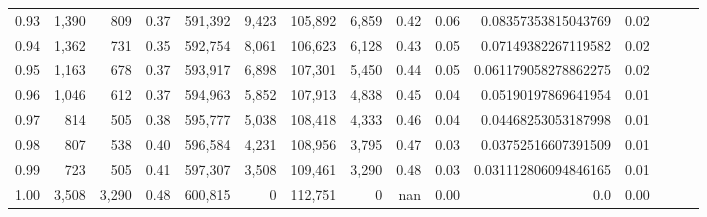 \begin{tabular}{rrrrrrrrrrrrrrr}
0.93 &   1,390 &    809 &  0.37 &  591,392 &    9,423 &  105,892 &    6,859 &  0.42 &  0.06 &   0.08357353815043769 &      0.02 \\
0.94 &   1,362 &    731 &  0.35 &  592,754 &    8,061 &  106,623 &    6,128 &  0.43 &  0.05 &   0.07149382267119582 &      0.02 \\
0.95 &   1,163 &    678 &  0.37 &  593,917 &    6,898 &  107,301 &    5,450 &  0.44 &  0.05 &  0.061179058278862275 &      0.02 \\
0.96 &   1,046 &    612 &  0.37 &  594,963 &    5,852 &  107,913 &    4,838 &  0.45 &  0.04 &   0.05190197869641954 &      0.01 \\
0.97 &     814 &    505 &  0.38 &  595,777 &    5,038 &  108,418 &    4,333 &  0.46 &  0.04 &   0.04468253053187998 &      0.01 \\
0.98 &     807 &    538 &  0.40 &  596,584 &    4,231 &  108,956 &    3,795 &  0.47 &  0.03 &   0.03752516607391509 &      0.01 \\
0.99 &     723 &    505 &  0.41 &  597,307 &    3,508 &  109,461 &    3,290 &  0.48 &  0.03 &  0.031112806094846165 &      0.01 \\
1.00 &   3,508 &  3,290 &  0.48 &  600,815 &        0 &  112,751 &        0 &   nan &  0.00 &                   0.0 &      0.00 \\
\bottomrule
\end{tabular}

